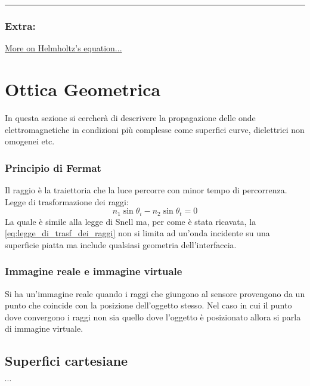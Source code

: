\documentclass{article}
\begin{document}
\vfill
\hrule
\subsubsection*{Extra:}
\href{https://physics.stackexchange.com/questions/334084/wave-vs-helmholtz-equation}{More on Helmholtz's equation...}

\newpage

\section*{Ottica Geometrica}
In questa sezione si cercherà di descrivere la propagazione delle onde elettromagnetiche in condizioni più complesse come superfici curve, dielettrici non omogenei etc.

\subsubsection*{Principio di Fermat}
Il raggio è la traiettoria che la luce percorre con minor tempo di percorrenza.\\
Legge di trasformazione dei raggi:
\begin{equation}	\label{eq:legge_di_trasf_dei_raggi}
n_1 \sin\theta_i - n_2 \sin\theta_t = 0
\end{equation}
La quale è simile alla legge di Snell ma, per come è stata ricavata, la \eqref{eq:legge_di_trasf_dei_raggi} non si limita ad un'onda incidente su una superficie piatta ma include qualsiasi geometria dell'interfaccia.

\subsubsection*{Immagine reale e immagine virtuale}
Si ha un'immagine reale quando i raggi che giungono al sensore provengono da un punto che coincide con la posizione dell'oggetto stesso. Nel caso in cui il punto dove convergono i raggi non sia quello dove l'oggetto è posizionato allora si parla di immagine virtuale.

\subsection*{Superfici cartesiane}
$\cdots$
\end{document}
